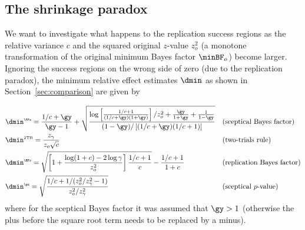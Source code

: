 \begin{subappendices}
\section{The shrinkage paradox}
\label{app:shrinkage}
We want to investigate what happens to the replication success regions as the
relative variance $c$ and the squared original $z$-value $z_{o}^{2}$ (a monotone
transformation of the original minimum Bayes factor $\minBF_{o}$) become larger.
Ignoring the success regions on the wrong side of zero (due to the replication
paradox), the minimum relative effect estimates $\dmin$ as shown in
Section~\ref{sec:comparison} are given by

\begin{align*}
    &\dmin^{\scriptscriptstyle \BFs} =
      \frac{1/c + \gy}{\gy - 1} +
      \sqrt{\frac{\log\left[\frac{1/c + 1}{(1/c + \gy)(1 + \gy)}\right]/z_{o}^{2}
      + \frac{\gy}{1 + \gy} + \frac{1}{1 - \gy}}{(1 - \gy)/\left[(1/c + \gy)(1/c + 1)\right]}}&
  &\text{(sceptical Bayes factor)} \\
    &\dmin^{\scriptscriptstyle \text{2TR}} =
      \frac{z_{\gamma}}{z_{o}\sqrt{c}}&
  &\text{(two-trials rule)} \\
    &\dmin^{\scriptscriptstyle \BFr} =
      \sqrt{\left[1 + \frac{\log(1 + c) - 2\log \gamma}{z_{o}^{2}}\right] \frac{1/c + 1}{c}} - \frac{1/c + 1}{1 + c} &
  &\text{(replication Bayes factor)} \\
    &\dmin^{\scriptscriptstyle \ps} =
      \sqrt{\frac{1/c + 1/(z_{o}^{2}/z_{\gamma}^{2} - 1)}{z_{o}^{2}/z_{\gamma}^{2}}}&
  &\text{(sceptical $p$-value)} \\
\end{align*}
where for the sceptical Bayes factor it was assumed that $\gy > 1$ (otherwise
the plus before the square root term needs to be replaced by a minus).


\end{subappendices}
